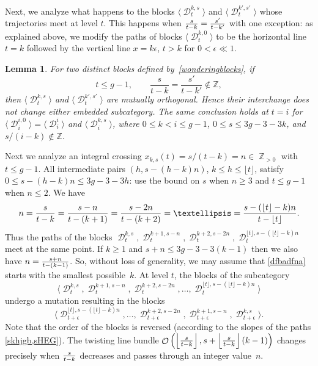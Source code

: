 \documentclass[11pt,letterpaper]{amsart}
\theoremstyle{plain}
\newtheorem{lemma}[theorem]{Lemma}
\theoremstyle{definition}
\theoremstyle{remark}
\numberwithin{equation}{section}
\DeclareMathOperator{\cD}{\mathcal{D}}
\DeclareMathOperator{\cO}{\mathcal{O}}
\DeclareMathOperator{\bZ}{{\mathbb{Z}}}
\newcommand{\ft}{{\lfloor t\rfloor}}
\begin{document}
Next, we analyze what happens to the blocks $\langle\cD^{k,s}_{t}\rangle$ and  $\langle\cD^{k',s'}_{t}\rangle$ 
whose trajectories meet  at level $t$. 
This happens when
${s\over t-k}={s'\over t-k'}$ with one exception: as explained above, we modify
the paths of blocks $\langle\cD^{k,0}_{t}\rangle$
to be the horizontal line $t=k$ followed by the vertical line $x=k\epsilon$, $t>k$ for $0<\epsilon\ll1$.

\begin{lemma}\label{sgsrhsRHJ}
For two distinct blocks defined by~\eqref{wonderingblocks}, if
\[
 t\le g-1,\qquad
 \frac{s}{t-k}=\frac{s'}{t-k'}\notin\mathbb Z,
\]
then $\langle\cD^{k,s}_{t}\rangle$ and
$\langle\cD^{k',s'}_{t}\rangle$ are mutually orthogonal. Hence their
interchange does not change either embedded subcategory.
The same conclusion holds at $t=i$ for
$\langle\cD_i^{i,0}\rangle=\langle\cD_i^i\rangle$ and
$\langle\cD_i^{k,s}\rangle$, where $0\le k<i\le g-1$,
$0\le s\le3g-3-3k$, and $s/(i-k)\notin\mathbb Z$.
\end{lemma}



Next we analyze an integral crossing
$x_{k,s}(t)=s/(t-k)=n\in\bZ_{>0}$ with $t\le g-1$.
All intermediate pairs $(h,s-(h-k)n)$, $k\le h\le\ft$, satisfy
$0\le s-(h-k)n\le3g-3-3h$: use the bound on $s$ when $n\ge3$
and $t\le g-1$ when $n\le2$. We have
\begin{equation}\label{dfbadfna}
n={s\over t-k}={s-n\over t-(k+1)}={s-2n\over t-(k+2)}=\ldots={s-(\ft-k)n\over t-\ft}.
\end{equation}
Thus the paths of the blocks $\cD^{k,s}_{t},\cD^{k+1,s-n}_{t},\cD^{k+2,s-2n}_{t},\cD^{\ft,s-(\ft-k)n}_{t}$
meet at the same point.
If $k\ge1$ and $s+n\le 3g-3-3(k-1)$ then we also have $n={s+n\over t-(k-1)}$.
So, without loss of generality, we may assume that \eqref{dfbadfna} starts with the smallest possible~$k$.
At level $t$, the blocks of the subcategory 
\begin{equation}\label{	kwhrb,whjBG}
\langle\cD^{k,s}_{t},\cD^{k+1,s-n}_{t},\cD^{k+2,s-2n}_{t},\ldots,\cD^{\ft,s-(\ft-k)n}_{t}\rangle
\end{equation}
undergo a mutation resulting in the blocks
\begin{equation}\label{qerhqehqe5he}
\langle \cD^{\ft,s-(\ft-k)n}_{t+\epsilon}, \ldots, \cD^{k+2,s-2n}_{t+\epsilon}, \cD^{k+1,s-n}_{t+\epsilon},
\cD^{k,s}_{t+\epsilon}\rangle.
\end{equation}
Note that the order of the blocks is reversed (according to the slopes of the paths
\eqref{skhjgb,sHEG}). 
The twisting line bundle
$\cO\left(\left\lfloor{s\over t-k}\right\rfloor, s+\left\lfloor{s\over t-k}\right\rfloor(k-1)\right)$
changes precisely when ${s\over t-k}$ decreases and passes through an integer value~$n$. 
\end{document}
